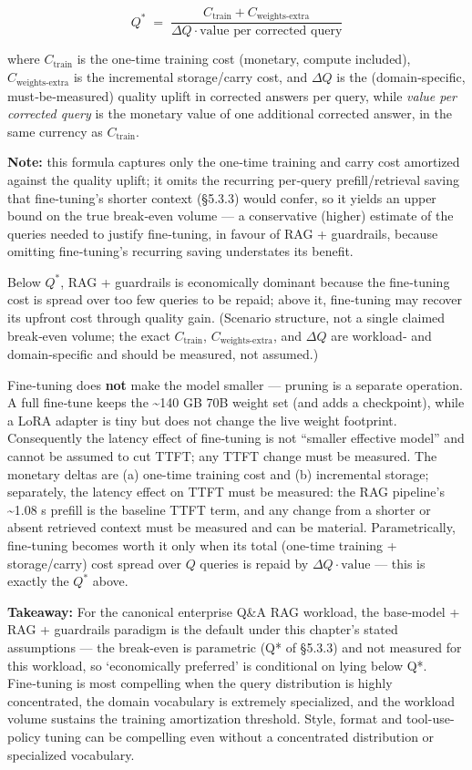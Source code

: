 \[
Q^*\; =\; \frac{C_\text{train} + C_\text{weights-extra}}{\Delta Q \cdot \text{value per corrected query}}
\]

where \(C_\text{train}\) is the one‑time training cost (monetary,
compute included), \(C_\text{weights-extra}\) is the incremental
storage/carry cost, and \(\Delta Q\) is the (domain‑specific,
must‑be‑measured) quality uplift in corrected answers per query, while
\emph{value per corrected query} is the monetary value of one additional
corrected answer, in the same currency as \(C_\text{train}\).

\textbf{Note:} this formula captures only the one‑time training and
carry cost amortized against the quality uplift; it omits the recurring
per‑query prefill/retrieval saving that fine‑tuning's shorter context
(§5.3.3) would confer, so it yields an upper bound on the true
break‑even volume --- a conservative (higher) estimate of the queries
needed to justify fine‑tuning, in favour of RAG + guardrails, because
omitting fine‑tuning's recurring saving understates its benefit.

Below \(Q^*\), RAG + guardrails is economically dominant because the
fine‑tuning cost is spread over too few queries to be repaid; above it,
fine‑tuning may recover its upfront cost through quality gain. (Scenario
structure, not a single claimed break‑even volume; the exact
\(C_\text{train}\), \(C_\text{weights-extra}\), and \(\Delta Q\) are
workload‑ and domain‑specific and should be measured, not assumed.)

Fine‑tuning does \textbf{not} make the model smaller --- pruning is a
separate operation. A full fine‑tune keeps the \textasciitilde140 GB 70B
weight set (and adds a checkpoint), while a LoRA adapter is tiny but
does not change the live weight footprint. Consequently the latency
effect of fine‑tuning is not ``smaller effective model'' and cannot be
assumed to cut TTFT; any TTFT change must be measured. The monetary
deltas are (a) one-time training cost and (b) incremental storage;
separately, the latency effect on TTFT must be measured: the RAG
pipeline's \textasciitilde1.08 s prefill is the baseline TTFT term, and
any change from a shorter or absent retrieved context must be measured
and can be material. Parametrically, fine‑tuning becomes worth it only
when its total (one-time training + storage/carry) cost spread over
\(Q\) queries is repaid by \(\Delta Q \cdot \text{value}\) --- this is
exactly the \(Q^*\) above.

\textbf{Takeaway:} For the canonical enterprise Q\&A RAG workload, the
base‑model + RAG + guardrails paradigm is the default under this
chapter's stated assumptions --- the break-even is parametric (Q* of
§5.3.3) and not measured for this workload, so `economically preferred'
is conditional on lying below Q*. Fine‑tuning is most compelling when
the query distribution is highly concentrated, the domain vocabulary is
extremely specialized, and the workload volume sustains the training
amortization threshold. Style, format and tool-use-policy tuning can be
compelling even without a concentrated distribution or specialized
vocabulary.

